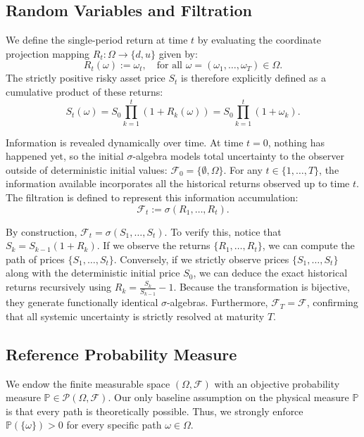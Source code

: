 \subsection{Random Variables and Filtration}
We define the single-period return at time $t$ by evaluating the coordinate projection mapping $R_t : \Omega \to \{d, u\}$ given by:
\begin{equation}
    R_t(\omega) := \omega_t, \quad \text{for all } \omega = (\omega_1, \dots, \omega_T) \in \Omega.
\end{equation}
The strictly positive risky asset price $S_t$ is therefore explicitly defined as a cumulative product of these returns:
\begin{equation}
    S_t(\omega) = S_0 \prod_{k=1}^t (1 + R_k(\omega)) = S_0 \prod_{k=1}^t (1 + \omega_k).
\end{equation}

Information is revealed dynamically over time. At time $t=0$, nothing has happened yet, so the initial $\sigma$-algebra models total uncertainty to the observer outside of deterministic initial values: $\mathcal{F}_0 = \{\emptyset, \Omega\}$. For any $t \in \{1, \dots, T\}$, the information available incorporates all the historical returns observed up to time $t$. The filtration is defined to represent this information accumulation:
\begin{equation}
    \mathcal{F}_t := \sigma(R_1, \dots, R_t).
\end{equation}

\begin{remark}
    By construction, $\mathcal{F}_t = \sigma(S_1, \dots, S_t)$. To verify this, notice that $S_k = S_{k-1}(1+R_k)$. If we observe the returns $\{R_1, \dots, R_t\}$, we can compute the path of prices $\{S_1, \dots, S_t\}$. Conversely, if we strictly observe prices $\{S_1, \dots, S_t\}$ along with the deterministic initial price $S_0$, we can deduce the exact historical returns recursively using $R_k = \frac{S_k}{S_{k-1}} - 1$. Because the transformation is bijective, they generate functionally identical $\sigma$-algebras. Furthermore, $\mathcal{F}_T = \mathcal{F}$, confirming that all systemic uncertainty is strictly resolved at maturity $T$.
\end{remark}

\subsection{Reference Probability Measure}
We endow the finite measurable space $(\Omega, \mathcal{F})$ with an objective probability measure $\mathbb{P} \in \mathscr{P}(\Omega, \mathcal{F})$. Our only baseline assumption on the physical measure $\mathbb{P}$ is that every path is theoretically possible. Thus, we strongly enforce $\mathbb{P}(\{\omega\}) > 0$ for every specific path $\omega \in \Omega$.

